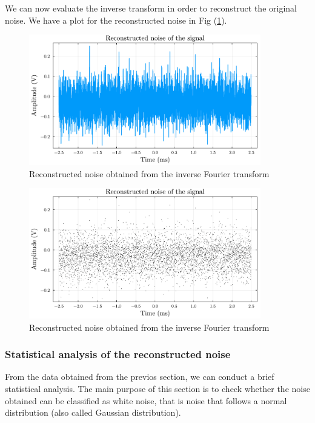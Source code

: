 \documentclass[a4paper,12pt]{article}
\begin{document}
\par We can now evaluate the inverse transform in order to reconstruct the original noise.
We have a plot for the reconstructed noise in Fig (\ref{plot:Only_noise}).
\begin{figure}[H]
    \centering
    \includegraphics[width=0.9\textwidth]{signal01_only_noise.pdf}
    \caption{Reconstructed noise obtained from the inverse Fourier transform}
    \label{plot:Only_noise}
\end{figure}
\begin{figure}[H]
    \centering
    \includegraphics[width=0.9\textwidth]{signal01_only_noise_scatter.pdf}
    \caption{Reconstructed noise obtained from the inverse Fourier transform}
    \label{plot:Only_noise_scatter}
\end{figure}


\subsubsection{Statistical analysis of the reconstructed noise}
\par From the data obtained from the previos section, we can conduct 
a brief statistical analysis. The main purpose of this section is to 
check whether the noise obtained can be classified as white noise, that is 
noise that follows a normal distribution (also called Gaussian distribution).
\end{document}
